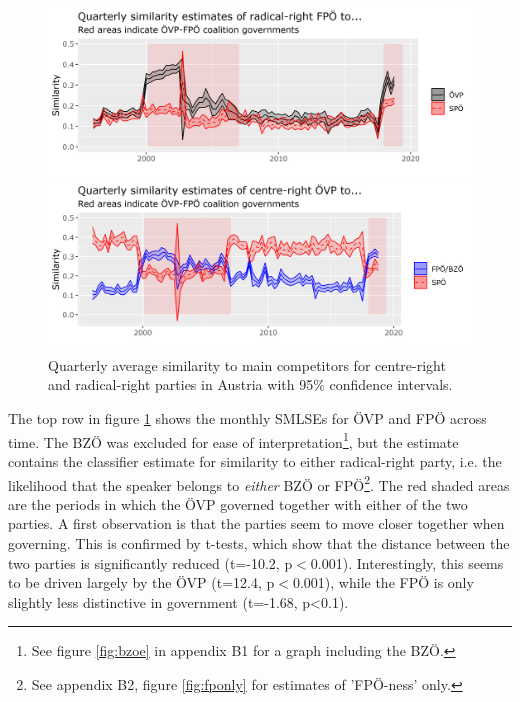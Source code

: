 \documentclass{article}
\begin{document}
\begin{figure}
\begin{minipage}{\textwidth}
\includegraphics[width=\linewidth]{AT/vis/AT_fp_paper.png}
\end{minipage}
\hfill
\begin{minipage}{\textwidth}
\includegraphics[width=\linewidth]{AT/vis/AT_vp_paper.png}
\end{minipage}
\caption{Quarterly average similarity to main competitors for centre-right and radical-right parties in Austria with 95\% confidence intervals.}
\label{fig:govs}
\end{figure}

The top row in figure \ref{fig:govs} shows the monthly SMLSEs for ÖVP and FPÖ across time. The BZÖ was excluded for ease of interpretation\footnote{See figure \ref{fig:bzoe} in appendix B1 for a graph including the BZÖ.}, but the estimate contains the classifier estimate for similarity to either radical-right party, i.e. the likelihood that the speaker belongs to \textit{either} BZÖ or FPÖ\footnote{See appendix B2, figure \ref{fig:fponly} for estimates of 'FPÖ-ness' only.}. The red shaded areas are the periods in which the ÖVP governed together with either of the two parties. A first observation is that the parties seem to move closer together when governing. This is confirmed by t-tests, which show that the distance between the two parties is significantly reduced (t=-10.2, p$<$0.001). Interestingly, this seems to be driven largely by the ÖVP (t=12.4, p$<$0.001), while the FPÖ is only slightly less distinctive in government (t=-1.68, p<0.1). \par
\end{document}

